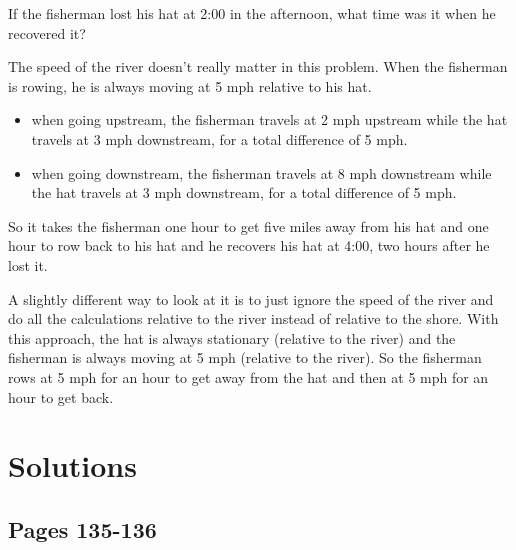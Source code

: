 \documentclass[fleqn,addpoints]{exam}
\begin{document}
\begin{questions}
If the fisherman lost his hat at 2:00 in the afternoon, what time was it when he recovered it?

\begin{solution}

The speed of the river doesn't really matter in this problem.  When the fisherman is rowing, he is always moving at 5
mph relative to his hat.

\begin{itemize}
  \item when going upstream, the fisherman travels at 2 mph upstream while the hat travels at 3 mph downstream, for a
    total difference of 5 mph.
  \item when going downstream, the fisherman travels at 8 mph downstream while the hat travels at 3 mph downstream, for a
    total difference of 5 mph.
\end{itemize}

So it takes the fisherman one hour to get five miles away from his hat and one hour to row back to his hat and he
recovers his hat at 4:00, two hours after he lost it.

A slightly different way to look at it is to just ignore the speed of the river and do all the calculations
relative to the river instead of relative to the shore.  With this approach, the hat is always stationary (relative to
the river) and the fisherman is always moving at 5 mph (relative to the river).  So the fisherman rows at 5 mph for an
hour to get away from the hat and then at 5 mph for an hour to get back.

\end{solution}

\end{questions}

\ifprintanswers

\section{Solutions}

\subsection{Pages 135-136}
\end{document}
